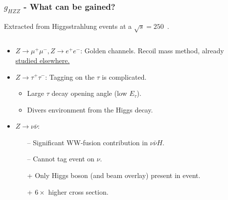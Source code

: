 
\begin{frame}
  \frametitle{$g_{HZZ}$ - What can be gained?}
  Extracted from Higgsstrahlung events at a $\sqrt{s}=250$~\GeV.
  \begin{columns}[c,onlytextwidth]
  \begin{column}{0.60\textwidth}
  \begin{itemize}
    \item $Z \rightarrow \mu^+ \mu^-, Z \rightarrow e^+ e^-$:
          Golden channels.\newline
          Recoil mass method, already {\color{llblue}
            \href{https://arxiv.org/abs/1604.07524}{studied elsewhere.}}
    \item $Z \rightarrow \tau^+ \tau^-$:
        Tagging on the $\tau$ is complicated.
        \begin{itemize}
          \item Large $\tau$ decay opening angle (low $E_\tau$).
          \item Divers environment from the Higgs decay.
        \end{itemize}
    \item $Z \rightarrow \nu\bar{\nu}$:
      \begin{itemize}
        \item[--] Significant WW-fusion contribution in $\nu\bar{\nu}H$.
        \item[--] Cannot tag event on $\nu$.
        \item[+]  Only Higgs boson (and beam overlay) present in event.
        \item[+]  $6\times$ higher cross section.
      \end{itemize}
  \end{itemize}
  \end{column}
  \begin{column}{0.40\textwidth}
    \resizebox{\textwidth}{!}{
      
    }
  \end{column}
  \end{columns}
  \end{frame}


